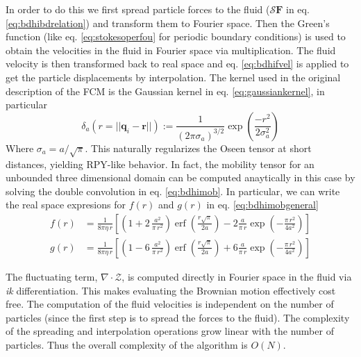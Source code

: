 \documentclass[ twoside,openright,titlepage,numbers=noenddot,%
headinclude,footinclude,cleardoublepage=empty,abstract=on,
BCOR=5mm,paper=a4,fontsize=11pt, dvipsnames
]{scrreprt}
\renewcommand{\vec}[1]{\bm{#1}}
\newcommand{\oper}[1]{\mathcal{#1}}
\DeclareMathOperator{\erf}{erf}
\newcommand{\ppos}{q}
\newcommand{\fpos}{r}
\begin{document}
In order to do this we first spread particle forces to the fluid ($\oper{S}\vec{F}$ in eq. \eqref{eq:bdhibdrelation}) and transform them to Fourier space. Then the Green's function (like eq. \eqref{eq:stokesoperfou} for periodic boundary conditions) is used to obtain the velocities in the fluid in Fourier space via multiplication. The fluid velocity is then transformed back to real space and eq. \eqref{eq:bdhifvel} is applied to get the particle displacements by interpolation.
The kernel used in the original description of the \gls{FCM} is the Gaussian kernel in eq. \eqref{eq:gaussiankernel}, in particular
\begin{equation}
  \label{eq:fcmkernel}
  \delta_a(r = ||\vec{\ppos}_i - \vec{\fpos}||) := \frac{1}{(2\pi\sigma_a)^{3/2}}\exp\left(\frac{-r^2}{2\sigma_a^2}\right)
\end{equation}
Where $\sigma_a = a/\sqrt{\pi}$. This naturally regularizes the Oseen tensor at short distances, yielding \gls{RPY}-like behavior. In fact, the mobility tensor for an unbounded three dimensional domain can be computed anaytically in this case by solving the double convolution in eq. \eqref{eq:bdhimob}. In particular, we can write the real space expresions for $f(r)$ and $g(r)$ in eq. \eqref{eq:bdhimobgeneral}
\begin{equation}
  \label{eq:fcmmob}
  \begin{aligned}
f(r) & =  \frac{1}{8\pi\eta\,r}\left[\left(1+2\,\frac{a^{2}}{\pi\,r^{2}}\right){\erf}\left(\frac{r\sqrt{\pi}}{2a}\right)-2\frac{a}{\pi\,r}\exp\left(-\frac{\pi\,r^{2}}{4a^{2}}\right)\right]\\
g(r) & =  \frac{1}{8\pi\eta\,r}\left[\left(1-6\,\frac{a^{2}}{\pi\,r^{2}}\right){\erf}\left(\frac{r\sqrt{\pi}}{2a}\right)+6\frac{a}{\pi\,r}\exp\left(-\frac{\pi\,r^{2}}{4a^{2}}\right)\right]
  \end{aligned}
\end{equation}

The fluctuating term, $\nabla\cdot\mathcal{Z}$, is computed directly in Fourier space in the fluid via \emph{ik} differentiation. This makes evaluating the Brownian motion effectively cost free.
The computation of the fluid velocities is independent on the number of particles (since the first step is to spread the forces to the fluid). The complexity of the spreading and interpolation operations grow linear with the number of particles. Thus the overall complexity of the algorithm is $O(N)$.
\end{document}
